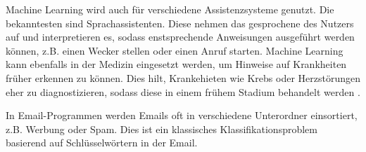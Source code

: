 Machine Learning wird auch für verschiedene Assistenzsysteme genutzt. Die bekanntesten sind Sprachassistenten. Diese nehmen das gesprochene des Nutzers auf und interpretieren es, sodass enstsprechende Anweisungen ausgeführt werden können, z.B. einen Wecker stellen oder einen Anruf starten.
Machine Learning kann ebenfalls in der Medizin eingesetzt werden, um Hinweise auf Krankheiten früher erkennen zu können. Dies hilt, Krankehieten wie Krebs oder Herzstörungen eher zu diagnostizieren, sodass diese in einem frühem Stadium behandelt werden \cite[vgl][]{AnwendungsBsp}.

In Email-Programmen werden Emails oft in verschiedene Unterordner einsortiert, z.B. Werbung oder Spam. Dies ist ein klassisches Klassifikationsproblem basierend auf Schlüsselwörtern in der Email.